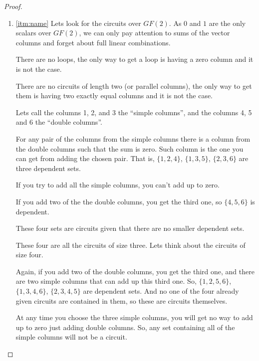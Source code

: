 \begin{proof}\label{t1:p1}
    \begin{enumerate}[label=(\roman*)]
        \item\label{t1:p1:i}
            \ref{itm:name}
            Lets look for the circuits over $GF(2)$. As $0$ and $1$ are the only scalars over $GF(2)$,
            we can only pay attention to sums of the vector columns and forget about full linear combinations.\pn
            
            There are no loops, the only way to get a loop is having a zero column and it is not the case.\pn
            
            There are no circuits of length two (or parallel columns), the only way to get them is having two 
            exactly equal columns and it is not the case.\pn
            
            Lets call the columns 1, 2, and 3 the ``simple columns'', and the columns 4, 5 and 6 the ``double columns''.\pn
            
            For any pair of the columns from the simple columns there is a column from the double columns 
            such that the sum is zero. Such column is the one you can get from adding the chosen pair. 
            That is, $\{1, 2, 4\}$, $\{1, 3, 5\}$, $\{2, 3, 6\}$ are three dependent sets.\pn
            
            If you try to add all the simple columns, you can't add up to zero.\pn
            
            If you add two of the the double columns, you get the third one, so $\{4, 5, 6\}$ is dependent.\pn
            
            These four sets are circuits given that there are no smaller dependent sets.\pn
            
            These four are all the circuits of size three. Lets think about the circuits of size four.\pn
            
            Again, if you add two of the double columns, you get the third one, and there are two simple columns that can
            add up this third one. So, $\{1, 2, 5, 6\}$, $\{1, 3, 4, 6\}$, $\{2, 3, 4, 5\}$ are dependent sets.
            And no one of the four already given circuits are contained in them, so these are circuits themselves.\pn
            
            At any time you choose the three simple columns, you will get no way to add up to zero just adding double columns.
            So, any set containing all of the simple columns will not be a circuit.\pn
            

\end{enumerate}
\end{proof}
